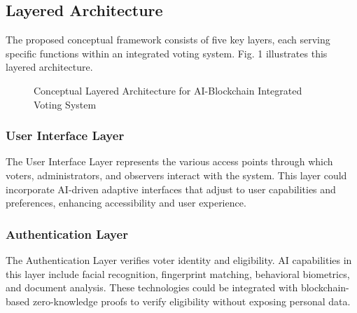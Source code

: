 \documentclass[conference]{IEEEtran}
\begin{document}
\subsection{Layered Architecture}
The proposed conceptual framework consists of five key layers, each serving specific functions within an integrated voting system. Fig. 1 illustrates this layered architecture.

\begin{figure}[!h]
\centering
{}
\caption{Conceptual Layered Architecture for AI-Blockchain Integrated Voting System}
\label{fig:architecture}
\end{figure}

\subsubsection{User Interface Layer}
The User Interface Layer represents the various access points through which voters, administrators, and observers interact with the system. This layer could incorporate AI-driven adaptive interfaces that adjust to user capabilities and preferences, enhancing accessibility and user experience.

\subsubsection{Authentication Layer}
The Authentication Layer verifies voter identity and eligibility. AI capabilities in this layer include facial recognition, fingerprint matching, behavioral biometrics, and document analysis. These technologies could be integrated with blockchain-based zero-knowledge proofs to verify eligibility without exposing personal data.
\end{document}
